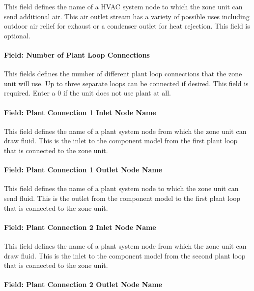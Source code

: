 This field defines the name of a HVAC system node to which the zone unit can send additional air. This air outlet stream has a variety of possible uses including outdoor air relief for exhaust or a condenser outlet for heat rejection. This field is optional.

\paragraph{Field: Number of Plant Loop Connections}\label{field-number-of-plant-loop-connections}

This fields defines the number of different plant loop connections that the zone unit will use. Up to three separate loops can be connected if desired. This field is required. Enter a 0 if the unit does not use plant at all.

\paragraph{Field: Plant Connection 1 Inlet Node Name}\label{field-plant-connection-1-inlet-node-name}

This field defines the name of a plant system node from which the zone unit can draw fluid. This is the inlet to the component model from the first plant loop that is connected to the zone unit.

\paragraph{Field: Plant Connection 1 Outlet Node Name}\label{field-plant-connection-1-outlet-node-name}

This field defines the name of a plant system node to which the zone unit can send fluid. This is the outlet from the component model to the first plant loop that is connected to the zone unit.

\paragraph{Field: Plant Connection 2 Inlet Node Name}\label{field-plant-connection-2-inlet-node-name}

This field defines the name of a plant system node from which the zone unit can draw fluid. This is the inlet to the component model from the second plant loop that is connected to the zone unit.

\paragraph{Field: Plant Connection 2 Outlet Node Name}\label{field-plant-connection-2-outlet-node-name}

